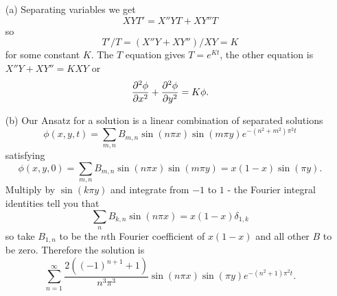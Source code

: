 \documentclass[12pt]{article}
\begin{document}
\begin{answer}
\begin{enumerate}
\item[(a)] Separating variables we get
\[XYT'=X''YT+XY''T\]
so
\[T'/T=(X''Y+XY'')/XY=K\]
for some constant $K$. The $T$ equation gives $T=e^{Kt}$, the other equation is $X''Y+XY''=KXY$ or
\[\dfrac{\partial^2 \phi}{\partial x^2}+\dfrac{\partial^2 \phi}{\partial y^2}=K\phi.\]
\item[(b)] Our Ansatz for a solution is a linear combination of separated solutions
\[\phi(x,y,t)=\sum_{m,n} B_{m,n}\sin(n\pi x)\sin(m\pi y)e^{-(n^2+m^2)\pi^2t}\]
satisfying
\[\phi(x,y,0)=\sum_{m,n} B_{m,n}\sin(n\pi x)\sin(m\pi y)=x(1-x)\sin(\pi y).\]
Multiply by $\sin(k\pi y)$ and integrate from $-1$ to $1$ - the Fourier integral identities tell you that
\[\sum_nB_{k,n}\sin(n\pi x)=x(1-x)\delta_{1,k}\]
so take $B_{1,n}$ to be the $n$th Fourier coefficient of $x(1-x)$ and all other $B$ to be zero. Therefore the solution is
\[\sum_{n=1}^{\infty}\frac{2((-1)^{n+1}+1)}{n^3\pi^3}\sin(n\pi x)\sin(\pi y)e^{-(n^2+1)\pi^2 t}.\]
\end{enumerate}
\end{answer}
\end{document}
